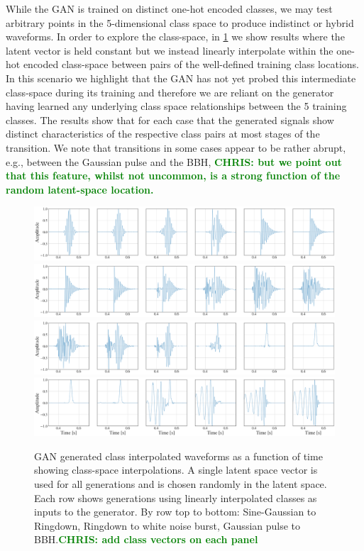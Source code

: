 \documentclass[12pt]{iopart}
\newcommand{\chris}[1]{\textbf{\textcolor{green}{CHRIS: #1}}}
\begin{document}
While the \ac{GAN} is trained on distinct one-hot encoded classes, we may test arbitrary points in the 5-dimensional class space to produce indistinct or hybrid waveforms. In order to explore the class-space, in \cref{fig:c_interp} we show results where the latent vector is held constant but we instead linearly
interpolate within the one-hot encoded class-space between pairs of the well-defined training class locations. In this scenario we highlight that the \ac{GAN} has not yet probed this intermediate class-space during its training and therefore we are reliant on the generator having learned any underlying class space relationships between the 5 training classes. The results show that for each case that the generated signals show distinct characteristics of the respective class pairs at most stages of the transition. We note that transitions in some cases appear to be rather abrupt, e.g., between the Gaussian pulse and the \ac{BBH}, \chris{but we point out that this feature, whilst not uncommon, is a strong function of the random latent-space location.}
%
\begin{figure}[!h]
    \centering
    \includegraphics[width=\textwidth]{figures/generations/sg-rd.png}
    \includegraphics[width=\textwidth]{figures/generations/rd-wnb.png}
    \includegraphics[width=\textwidth]{figures/generations/wnb-blip.png}
    \includegraphics[width=\textwidth]{figures/generations/blip-bbh.png}
    \caption{\ac{GAN} generated class interpolated waveforms as a function of time showing class-space interpolations. A single latent space vector is used for all generations and is chosen randomly in the latent space. Each row shows generations using linearly interpolated classes as inputs to the generator. By row top to bottom: Sine-Gaussian to Ringdown, Ringdown to white noise burst, Gaussian pulse to BBH.\chris{add class vectors on each panel}}
    \label{fig:c_interp}
\end{figure}
%
\end{document}

